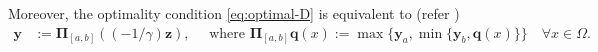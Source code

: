 \documentclass[smallextended]{svjour3}
\numberwithin{equation}{section}
\numberwithin{figure}{section}
\numberwithin{table}{section}
\newcommand\bI{\mathbf{I}}
\newcommand\bPi{\boldsymbol{\Pi}}
\newcommand\beps{\boldsymbol{\varepsilon}}
\newcommand\nn{{\boldsymbol{n}}}
\newcommand\by{\boldsymbol{y}}
\newcommand\bu{\boldsymbol{u}}
\newcommand\bz{\boldsymbol{z}}
\begin{document}
    Moreover, the optimality condition \eqref{eq:optimal-D} is equivalent to (refer \cite{troltzsch10})
		\begin{align*}
			\by &:= \bPi_{[a,b]} \left( \left({-1}/{\gamma}\right) \bz  \right),  \quad 
            \text{ where }  \bPi_{[a,b]} \boldsymbol{q}(x):= \max \{ \by_a, \min\{ \by_b, \boldsymbol{q}(x) \}\} \quad \forall x \in \Omega. 
		\end{align*}
\end{document}
